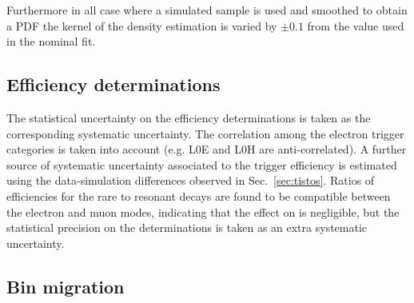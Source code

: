 Furthermore in all case where a simulated sample is used and smoothed to obtain a PDF
the kernel of the density estimation is varied by $\pm 0.1$ from the value used in the nominal fit.

\subsection{Efficiency determinations}

The statistical uncertainty on the efficiency determinations is taken as the corresponding systematic uncertainty.
The correlation among the electron trigger categories is taken into account (e.g. L0E and L0H are anti-correlated).
%
A further source of systematic uncertainty associated to the trigger efficiency is estimated using the data-simulation
differences observed in Sec.~\ref{sec:tistos}. Ratios of efficiencies for the rare to resonant decays are found to be 
compatible between the electron and muon modes, indicating that the effect on \RKst is negligible, but the statistical 
precision on the determinations is taken as an extra systematic uncertainty.


\subsection{Bin migration}

